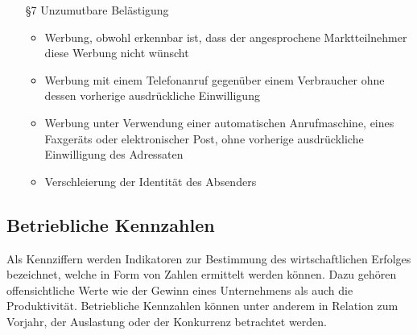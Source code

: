 \begin{itemize}
	\item[§7] Unzumutbare Belästigung
		\begin{itemize}
			\item Werbung, obwohl erkennbar ist, dass der angesprochene Marktteilnehmer diese Werbung nicht wünscht
			\item Werbung mit einem Telefonanruf gegenüber einem Verbraucher ohne dessen vorherige ausdrückliche Einwilligung
			\item Werbung unter Verwendung einer automatischen Anrufmaschine, eines Faxgeräts oder elektronischer Post, ohne vorherige ausdrückliche Einwilligung des Adressaten
			\item Verschleierung der Identität des Absenders
		\end{itemize}
\end{itemize}


\subsection{Betriebliche Kennzahlen}

Als Kennziffern werden Indikatoren zur Bestimmung des wirtschaftlichen Erfolges bezeichnet, welche in Form von Zahlen ermittelt werden können. Dazu gehören offensichtliche Werte wie der Gewinn eines Unternehmens als auch die Produktivität. Betriebliche Kennzahlen können unter anderem in Relation zum Vorjahr, der Auslastung oder der Konkurrenz betrachtet werden.\\


